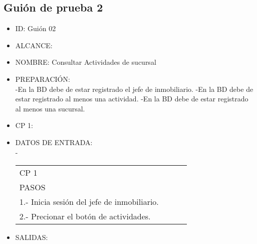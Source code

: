 \subsection{Guión de prueba 2}
\begin{itemize}
	\item ID: Guión 02
	\item ALCANCE: 
	\item NOMBRE: Consultar Actividades de sucursal  
	\item PREPARACIÓN:\\
	-En la BD debe de estar registrado el jefe de inmobiliario.
	-En la BD debe de estar registrado al menos una actividad.
	-En la BD debe de estar registrado al menos una sucursal.
	\item CP 1:
	\item DATOS DE ENTRADA:\\
	-
	\begin{center}			
		\begin{tabular}{|l|l|l|l|}
			\hline
			CP 1\\
			PASOS\\
			\hline 1.- Inicia sesión del jefe de inmobiliario.\\
			\hline 2.- Precionar el botón de actividades.\\
			\hline
		\end{tabular}
	\end{center}
	\item SALIDAS: \label{CU1LoginJI}
	
\end{itemize}

